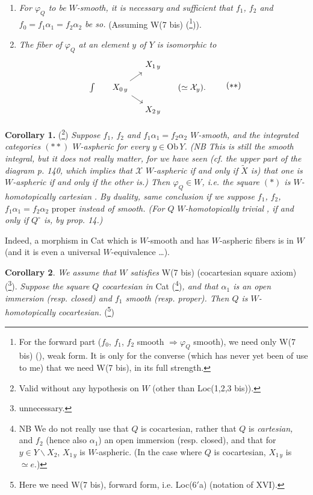 \documentclass[11pt]{article}
\newcommand{\printedpage}[1]{\marginpar{\footnotesize p.~#1}}
\newcommand{\msp}[1]{\marginpar{\footnotesize [#1]}}
\begin{document}
\begin{enumerate}
\item[\textit{a)}] \textit{For $\varphi_Q$ to be $W$-smooth, it is necessary and sufficient that $f_1$, $f_2$ and $f_0 = f_1\alpha_1 = f_2\alpha_2$ be so.} (Assuming W(7 bis) (\footnote{For the forward part ($f_0$, $f_1$, $f_2$ smooth $\Longrightarrow \varphi_Q$ smooth), we need only W(7 bis) (\footnotemark), weak form. It is only for the converse (which has never yet been of use to me) that we need W(7 bis), in its full strength.})).

\item[\textit{b)}] \textit{The fiber of $\varphi_Q$ at an element $y$ of $Y$ is isomorphic to}
\[
\begin{tikzcd}[row sep=small, column sep=small]
 & & X_{1\,y} & \\
\int &[-1.2em] X_{0\,y} \arrow[ur] \arrow[dr] & &[2em] (\simeq \mathcal{X}_y). \\
 & & X_{2\,y} &
\end{tikzcd}
\tag*{$(**)$}
\]
\end{enumerate}

\textbf{Corollary 1.} (\footnote{Valid without any hypothesis on $W$ (other than Loc(1,2,3 bis)).}) \textit{Suppose $f_1$, $f_2$ and $f_1\alpha_1 = f_2\alpha_2$ $W$-smooth, and the integrated categories $(**)$ $W$-aspheric for every $y \in \mathrm{Ob}\,Y$. (NB This is still the smooth integral, but it does not really matter, for we have seen (cf. the upper part of the diagram p. 140, which implies that $\mathcal{X}$} \textit{$W$-aspheric if and only if $\tilde{X}$ is) that one is $W$-aspheric if and only if the other is.) Then $\varphi_Q \in W$, i.e. the square $(*)$ is $W$-homotopically cartesian} \textit{. By duality, same conclusion if we suppose $f_1$, $f_2$, $f_1\alpha_1 = f_2\alpha_2$} proper \textit{instead of smooth. (For $Q$ $W$-homotopically trivial} \textit{, if and only if $Q^\circ$ is, by} \textit{prop. 14.)}

\msp{page 148}Indeed, a morphism in Cat which is $W$-smooth and has $W$-aspheric fibers is in $W$ (and it is even a universal $W$-equivalence \dots).

\textbf{Corollary 2}. \textit{We assume that $W$ satisfies} W(7 bis) (cocartesian square axiom) (\footnote{unnecessary.}).
\printedpage{102}
\textit{Suppose the square $Q$ cocartesian in} Cat (\footnote{NB We do not really use that $Q$ is cocartesian, rather that $Q$ is \textit{cartesian,} and $f_2$ (hence also $\alpha_1$) an open immersion (resp. closed), and that for $y \in Y\backslash X_2$, $X_{1\,y}$ is $W$-aspheric. (In the case where $Q$ is cocartesian, $X_{1\,y}$ is $\simeq e$.)})\textit{, and that $\alpha_1$ is an open immersion (resp. closed) and $f_1$ smooth (resp. proper). Then $Q$ is $W$-homotopically cocartesian.} (\footnote{Here we need W(7 bis), forward form, i.e. Loc(6$'$a) (notation of XVI).})
\end{document}
